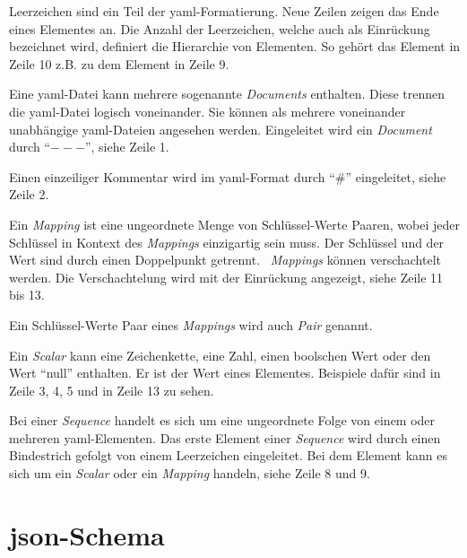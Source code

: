 \begin{description}
    \setlength\itemsep{-0.5cm}
    \item[Einrückung und Leerzeichen]
          Leerzeichen sind ein Teil der \acs{yaml}-Formatierung. Neue Zeilen zeigen das Ende eines Elementes an.
          Die Anzahl der Leerzeichen, welche auch als Einrückung bezeichnet wird, definiert die Hierarchie von Elementen.
          So gehört das Element in Zeile 10 z.B. zu dem Element in Zeile 9.
    \item[Document]
          Eine \ac{yaml}-Datei kann mehrere sogenannte \textit{Documents} enthalten. Diese trennen die \ac{yaml}-Datei logisch voneinander.
          Sie können als mehrere voneinander unabhängige \ac{yaml}-Dateien angesehen werden.
          Eingeleitet wird ein \textit{Document}
          durch ``$---$'', siehe Zeile 1.
    \item[Kommentare]
          Einen einzeiliger Kommentar wird im \ac{yaml}-Format durch ``$\#$'' eingeleitet, siehe Zeile 2.
    \item[Mapping]
          Ein \textit{Mapping} ist eine ungeordnete Menge von Schlüssel-Werte Paaren, wobei jeder Schlüssel
          in Kontext des \textit{Mappings} einzigartig sein muss.
          Der Schlüssel und der Wert sind durch einen Doppelpunkt getrennt.
          \ \textit{Mappings} können verschachtelt werden.
          Die Verschachtelung wird mit der Einrückung angezeigt, siehe Zeile 11 bis 13.
    \item[Pair]
          Ein Schlüssel-Werte Paar eines \textit{Mappings} wird auch \textit{Pair} genannt.
    \item[Scalar]
          Ein \textit{Scalar} kann eine Zeichenkette, eine Zahl, einen boolschen Wert oder den Wert ``null'' enthalten.
          Er ist der Wert eines Elementes.
          Beispiele dafür sind in Zeile 3, 4, 5 und in Zeile 13 zu sehen.
    \item[Sequence]
          Bei einer \textit{Sequence} handelt es sich um eine ungeordnete Folge von einem oder mehreren \ac{yaml}-Elementen.
          Das erste Element einer \textit{Sequence} wird durch einen Bindestrich gefolgt von einem Leerzeichen eingeleitet.
          Bei dem Element kann es sich um ein \textit{Scalar} oder ein \textit{Mapping} handeln, siehe Zeile 8 und 9.

\end{description}


\section{\acs{json}-Schema}\label{sec:json-schema}

